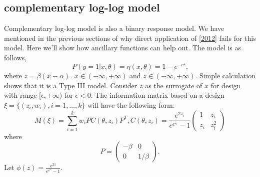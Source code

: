 \documentclass[11pt]{amsart}
\theoremstyle{definition}
\theoremstyle{remark}
\begin{document}
\subsection{complementary log-log model } 

Complementary log-log model is also a binary response model. We have mentioned in the previous sections of why direct application of \ref{2012} fails for this model. Here we'll show how ancillary functions can help out. The model is as follows,\[
P(y=1|x,\theta) = \eta(x,\theta)= 1-e^{-e^z}.
\]where $z = \beta(x-\alpha)$. $x\in (-\infty,+\infty)$ and $z\in (-\infty,+\infty)$. Simple calculation shows that it is a Type III model. Consider $z$ as the surrogate of $x$ for design with range $[\epsilon, +\infty)$ for $\epsilon <0$. The information matrix based on a design $\xi = \{(z_i,w_i), i=1,\ldots,k\}$ will have the following form: \begin{equation}
M(\xi) = \sum_{i=1}^{k} w_i PC(\theta,z_i) P^T, C(\theta,z_i) = \frac{e^{2z_i}}{e^{e^{z_i}}-1}\left( \begin{array}{cc}
1 & z_i\\
z_i & z_i^2
\end{array} \right)
\end{equation} where \[P = \left( \begin{array}{cc}
-\beta & 0\\
0 & 1/\beta
\end{array} \right).\] 
Let $\phi(z) =  \frac{e^{2z}}{e^{e^z}-1}$. 
\end{document}
